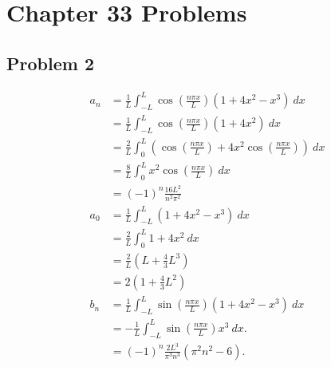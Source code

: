 \documentclass[10pt]{mypackage}
\begin{document}
\RaggedRight
\section{Chapter 33 Problems}%
\subsection{Problem 2}%
\begin{align*}
  a_n &= \frac{1}{L}\int_{-L}^{L} \cos\left(\frac{n\pi x}{L}\right)\left(1 + 4x^2 - x^3\right)\:dx\\
      &= \frac{1}{L}\int_{-L}^{L} \cos\left(\frac{n\pi x}{L}\right)\left(1 + 4x^2\right)\:dx\\
      &= \frac{2}{L}\int_{0}^{L} \left(\cos\left(\frac{n\pi x}{L}\right) + 4x^2\cos\left(\frac{n\pi x}{L}\right)\right)\:dx\\
      &= \frac{8}{L}\int_{0}^{L}x^2\cos\left(\frac{n\pi x}{L}\right) \:dx\\
      &= \left(-1\right)^n\frac{16L^2}{n^2\pi^2}\\
  a_0 &= \frac{1}{L}\int_{-L}^{L} \left(1 + 4x^2 - x^3\right)\:dx\\
      &= \frac{2}{L}\int_{0}^{L} 1 + 4x^2\:dx\\
      &= \frac{2}{L}\left(L + \frac{4}{3}L^3\right)\\
      &= 2\left(1 + \frac{4}{3}L^2\right)\\
  b_n &= \frac{1}{L}\int_{-L}^{L} \sin\left(\frac{n\pi x}{L}\right)\left(1 + 4x^2 - x^3\right)\:dx\\
      &= -\frac{1}{L}\int_{-L}^{L} \sin\left(\frac{n\pi x}{L}\right)x^3\:dx.\\
      &= \left(-1\right)^n\frac{2L^3}{\pi^3n^3}\left(\pi^2n^2 - 6\right).
\end{align*}
\end{document}
